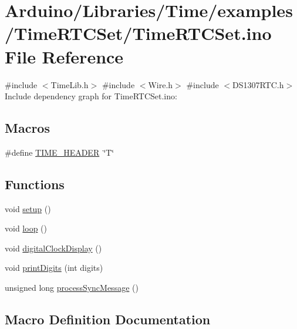 \hypertarget{_time_r_t_c_set_8ino}{}\section{Arduino/\+Libraries/\+Time/examples/\+Time\+R\+T\+C\+Set/\+Time\+R\+T\+C\+Set.ino File Reference}
\label{_time_r_t_c_set_8ino}
{\ttfamily \#include $<$Time\+Lib.\+h$>$}\newline
{\ttfamily \#include $<$Wire.\+h$>$}\newline
{\ttfamily \#include $<$D\+S1307\+R\+T\+C.\+h$>$}\newline
Include dependency graph for Time\+R\+T\+C\+Set.\+ino\+:
\subsection*{Macros}
\begin{DoxyCompactItemize}
\item 
\#define \hyperlink{_time_r_t_c_set_8ino_aa9f2cbf2a35ec653aff12241a63ca864}{T\+I\+M\+E\+\_\+\+H\+E\+A\+D\+ER}~\char`\"{}T\char`\"{}
\end{DoxyCompactItemize}
\subsection*{Functions}
\begin{DoxyCompactItemize}
\item 
void \hyperlink{_time_r_t_c_set_8ino_a4fc01d736fe50cf5b977f755b675f11d}{setup} ()
\item 
void \hyperlink{_time_r_t_c_set_8ino_afe461d27b9c48d5921c00d521181f12f}{loop} ()
\item 
void \hyperlink{_time_r_t_c_set_8ino_a01f3a72442d58926459c48afce4746e7}{digital\+Clock\+Display} ()
\item 
void \hyperlink{_time_r_t_c_set_8ino_a772afab0396032477ec7b01d14c774b2}{print\+Digits} (int digits)
\item 
unsigned long \hyperlink{_time_r_t_c_set_8ino_ab1e6944e759fa7efc4631df7f3268411}{process\+Sync\+Message} ()
\end{DoxyCompactItemize}


\subsection{Macro Definition Documentation}
\mbox{\label{_time_r_t_c_set_8ino_aa9f2cbf2a35ec653aff12241a63ca864}} 
